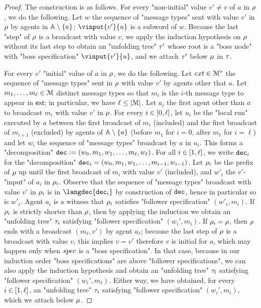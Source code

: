 \begin{proof}
	The construction is as follows.
	For every  "non-initial" value $v' \ne v$ of $a$ in $\rho$, we do the following. Let $w$ the sequence of "message types" sent with value $v'$ in $\rho$ by agents in $\mathbb{A} \setminus \{a\}$; $\vinput{v'}{u}$ is a subword of $w$. Because the last "step" of $\rho$ is a broadcast with value $v$, we apply the induction hypothesis on $\rho$ without its last step to obtain an "unfolding tree" $\tau'$ whose root is a "boss node" with "boss specification" $\vinput{v'}{u}$, and we attach $\tau'$ below $\mu$ in $\tau$.


	For every $v'$ "initial" value of $a$ in $\rho$, we do the following.  
	Let $\mathsf{ext} \in \messages^*$ the sequence of "message types" sent in $\rho$ with value $v'$ by agents other that $a$. Let $m_1, \dots, m_\ell \in \mathcal{M}$ distinct message types so that $m_i$ is the $i$-th message type to appear in $\mathsf{ext}$; in particular, we have $\ell \leq |\mathcal{M}|$. 
	Let $a_i$ the first agent other than $a$ to broadcast $m_i$ with value $v'$ in $\rho$. For every $i \in [0,\ell]$, let $u_i$ be the "local run" executed by $a$ between the first broadcast of $m_i$ (included) and the first broadcast of $m_{i+1}$ (excluded) by agents of $\mathbb{A} \setminus \{a\}$ (before $m_1$ for $i=0$, after $m_\ell$ for $i = \ell$) and let $w_i$ the sequence of "message types" broadcast by $a$ in $u_i$. This forms a "decomposition" $\mathtt{dec} := (w_0, m_1, w_1, \ldots, m_\ell, w_\ell)$.
	For all $i \in [1,\ell]$, we write $\mathtt{dec}_i$ for the "decomposition" $\mathtt{dec}_i = (w_0, m_1, w_1, \ldots, m_{i-1}, w_{i-1})$. Let $\rho_i$ be the prefix of $\rho$ up until the first broadcast of $m_i$ with value $v'$ (included), and $w'_i$ the $v'$-"input" of $a_i$ in $\rho_i$. Observe that the sequence of "message types" broadcast with value $v'$ in $\rho_i$ is in $\langdec{\decsymb_i}$ by construction of $\mathtt{dec}$, hence in particular so is $w'_i$. Agent $a_i$ is a witness that $\rho_i$ satisfies "follower specification" $(w'_i, m_i)$. 
	If $\rho_i$ is strictly shorter than $\rho$, then by applying the induction we obtain an "unfolding tree" $\tau_i$ satisfying "follower specification" $(w_i', m_i)$. If $\rho_i = \rho$, then $\rho$ ends with a broadcast $(m_\ell,v')$ by agent $a_\ell$; because the last step of $\rho$ is a broadcast with value $v$, this implies $v = v'$ therefore $v$ is initial for $a$, which may happen only when $\spec$ is a "boss specification". In that case, because in our induction order "boss specifications" are above "follower specifications", we can also apply the induction hypothesis and obtain an "unfolding tree" $\tau_l$ satisfying "follower specification" $(w_\ell', m_\ell)$. Either way, we have obtained, for every $i \in [1,\ell]$, an "unfolding tree" $\tau_i$ satisfying "follower specification" $(w_i', m_i)$, which we attach below $\mu$. 
	

\end{proof}
